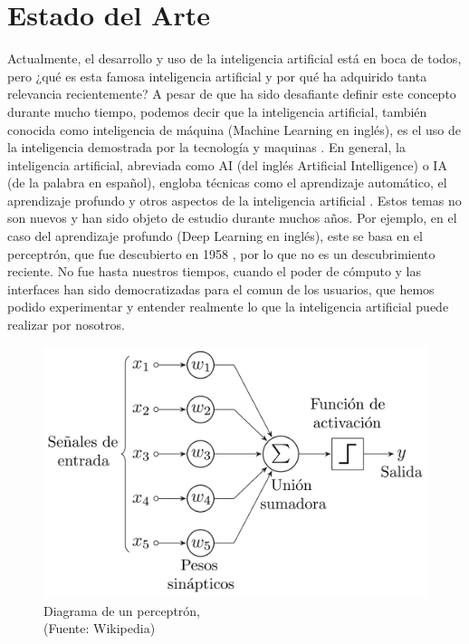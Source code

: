 
\chapter{Estado del Arte}


\par Actualmente, el desarrollo y uso de la inteligencia artificial está en boca de todos, pero ¿qué es esta famosa 
inteligencia artificial y por qué ha adquirido tanta relevancia recientemente? A pesar de que ha sido desafiante
definir este concepto durante mucho tiempo, podemos decir que la inteligencia artificial, también conocida 
como inteligencia de máquina (Machine Learning en inglés), es el uso de la inteligencia demostrada por la 
tecnología y maquinas \cite{mt1}. En general, la inteligencia artificial, abreviada como AI (del inglés Artificial Intelligence) 
o IA (de la palabra en español), engloba técnicas como el aprendizaje automático, el aprendizaje profundo y
otros aspectos de la inteligencia artificial \cite{mt1}. Estos temas no son nuevos y han sido objeto de estudio durante 
muchos años. Por ejemplo, en el caso del aprendizaje profundo (Deep Learning en inglés), este se basa en el 
perceptrón, que fue descubierto en 1958 \cite{perceptron}, por lo que no es un descubrimiento reciente. No fue hasta nuestros tiempos, cuando el poder de cómputo y las interfaces 
han sido democratizadas para el comun de los usuarios, que hemos podido experimentar y entender realmente lo que la 
inteligencia artificial puede realizar por nosotros.\\


\begin{figure}[ht!]
    \centering
    \includegraphics[width=.75\textwidth]{figures/ea1.png}
    \caption[Estructura del perceptrón]{Diagrama de un perceptrón,\\
    {\scriptsize (Fuente: Wikipedia)}}
    \label{fig:ea1}
\end{figure}

